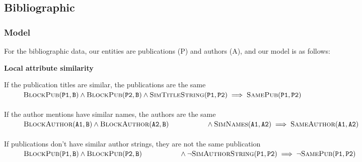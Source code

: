 \documentclass{article}
\begin{document}
    \subsection{Bibliographic}
        
        \subsubsection{Model}
            
            For the bibliographic data, our entities are publications (P) and authors (A), and our model is as follows:
            
                \textbf{Local attribute similarity}
            
                    If the publication titles are similar, the publications are the same \\
                    $ ~~~~~~~~\textsc{BlockPub}(\texttt{P1}, \texttt{B})
                      \wedge \textsc{BlockPub}(\texttt{P2}, \texttt{B}) 
                      \wedge \textsc{SimTitleString}(\texttt{P1},\texttt{P2})
                      \implies \textsc{SamePub}(\texttt{P1},\texttt{P2})$\\ \\
                    If the author mentions have similar names, the authors are the same \\
                    $  ~~~~~~~~\textsc{BlockAuthor}(\texttt{A1}, \texttt{B})
                       \wedge \textsc{BlockAuthor}(\texttt{A2}, \texttt{B}) \\
                       ~~~~~~~~~~~~~~~~\wedge \textsc{SimNames}(\texttt{A1},\texttt{A2})
                       \implies \textsc{SameAuthor}(\texttt{A1},\texttt{A2})$\\ \\
                    If publications don't have similar author strings, they are not the same publication \\
                    $ ~~~~~~~~\textsc{BlockPub}(\texttt{P1}, \texttt{B})
                       \wedge \textsc{BlockPub}(\texttt{P2}, \texttt{B}) \\
                       ~~~~~~~~~~~~~~~~\wedge \neg{}\textsc{SimAuthorString}(\texttt{P1},\texttt{P2})
                       \implies \neg{}\textsc{SamePub}(\texttt{P1},\texttt{P2})$    
                       
\end{document}
